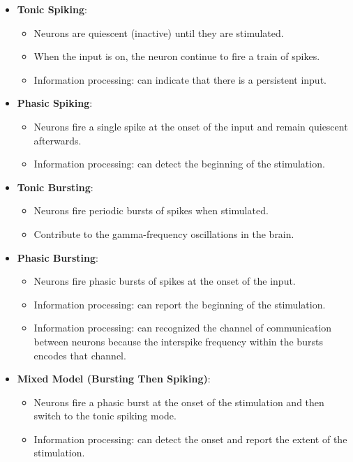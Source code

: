 \documentclass{article} %
\begin{document}
\begin{itemize}
    \item \textbf{Tonic Spiking}:
    \begin{itemize}
        \item Neurons are quiescent (inactive) until they are stimulated.
        \item When the input is on, the neuron continue to fire a train of spikes.
        \item Information processing: can indicate that there is a persistent input.
    \end{itemize}
    
    \item \textbf{Phasic Spiking}:
    \begin{itemize}
        \item Neurons fire a single spike at the onset of the input and remain quiescent afterwards.
        \item Information processing: can detect the beginning of the stimulation.
    \end{itemize}
    
    \item \textbf{Tonic Bursting}:
    \begin{itemize}
        \item Neurons fire periodic bursts of spikes when stimulated.
        \item Contribute to the gamma-frequency oscillations in the brain.
    \end{itemize}
    
    \item \textbf{Phasic Bursting}:
    \begin{itemize}
        \item Neurons fire phasic bursts of spikes at the onset of the input.
        \item Information processing: can report the beginning of the stimulation.
        \item Information processing: can recognized the channel of communication between neurons because the interspike frequency within the bursts encodes that channel. 
    \end{itemize}
    
    \item \textbf{Mixed Model (Bursting Then Spiking)}:
    \begin{itemize}
        \item Neurons fire a phasic burst at the onset of the stimulation and then switch to the tonic spiking mode.
        \item Information processing: can detect the onset and report the extent of the stimulation.
    \end{itemize}
    

\end{itemize}
\end{document}
